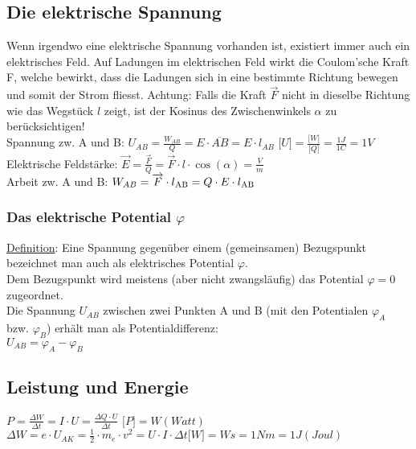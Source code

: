 \subsection{Die elektrische Spannung}
Wenn irgendwo eine elektrische Spannung vorhanden ist, existiert immer auch ein elektrisches Feld. Auf Ladungen im elektrischen Feld wirkt die Coulom'sche Kraft F, welche bewirkt, dass die Ladungen sich in eine bestimmte Richtung bewegen und somit der Strom fliesst. Achtung: Falls die Kraft $\overrightarrow{F}$ nicht in dieselbe Richtung wie das Wegstück $l$ zeigt, ist der Kosinus des Zwischenwinkels $\alpha$ zu berücksichtigen! \\
	Spannung zw. A und B: $U _{AB} = \frac{W _{AB}}{Q}= E \cdot \overline{AB} = E \cdot l_{AB}$ \;
	$ \lbrack U \rbrack = \frac{\lbrack W \rbrack}{\lbrack Q \rbrack} = \frac{1J}{1C}=1V$	\\
	Elektrische Feldstärke: $\overrightarrow{E} = \frac{\overrightarrow{F}}{Q} = \overrightarrow{F} \cdot l \cdot \cos(\alpha) = \frac{V}{m}$\\
	Arbeit zw. A und B: $W_{AB} = \overrightarrow{F} \cdot l\textsubscript{AB} = Q \cdot E \cdot l \textsubscript{AB}$

\subsubsection{Das elektrische Potential $ \varphi $}
\underline{Definition}: Eine Spannung gegenüber einem (gemeinsamen) Bezugspunkt bezeichnet man auch als elektrisches Potential $\varphi$.\\
Dem Bezugspunkt wird meistens (aber nicht zwangsläufig) das Potential $\varphi = 0$ zugeordnet.\\
Die Spannung $U_{AB}$ zwischen zwei Punkten A und B (mit den Potentialen $\varphi _{A} $ bzw. $\varphi _{B}$) erhält man als Potentialdifferenz:\\ $ U_{AB}= \varphi _{A} - \varphi _{B}$\\

\subsection{Leistung und Energie}
$ P = \frac{\Delta W}{\Delta t}= I \cdot U = \frac{\Delta Q \cdot U}{\Delta t}$ \hspace{10pt} $\lbrack P \rbrack = W (Watt)$\\
$ \Delta W = e \cdot U_{AK} = \frac{1}{2} \cdot m_{e} \cdot v^2 = U \cdot I \cdot \Delta t$\hspace{10pt}$\lbrack W \rbrack = Ws = 1 Nm = 1J (Joul)$\\
